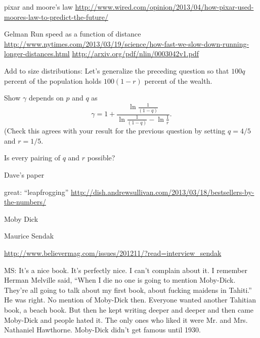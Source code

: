 \begin{frame}
  
pixar and moore's law
\url{http://www.wired.com/opinion/2013/04/how-pixar-used-moores-law-to-predict-the-future/}
\end{frame}


\begin{frame}
  
Gelman
Run speed as a function of distance
\url{http://www.nytimes.com/2013/03/19/science/how-fast-we-slow-down-running-longer-distances.html}
\url{http://arxiv.org/pdf/nlin/0003042v1.pdf}
\end{frame}


\begin{frame}
  

Add to size distributions:
    Let's generalize the preceding question so
    that $100q$ percent of the population
    holds $100(1-r)$ percent of the wealth.

    Show $\gamma$ depends on $p$ and $q$ as 
    $$
    \gamma
    =
    1 +
    \frac{\ln \frac{1}{(1-q)}}
      {\ln\frac{1}{(1-q)} - \ln \frac{1}{r}}.
    $$
    (Check this agrees with your result
    for the previous question by setting
    $q=4/5$ and $r=1/5$.

    Is every pairing of $q$ and $r$ possible?

Dave's paper


\end{frame}




great:
``leapfrogging''
\url{http://dish.andrewsullivan.com/2013/03/18/bestsellers-by-the-numbers/}


Moby Dick

Maurice Sendak

\url{http://www.believermag.com/issues/201211/?read=interview\_sendak}

MS: It's a nice book. It's perfectly nice. I can't complain about
it. I remember Herman Melville said, ``When I die no one is going to
mention Moby-Dick. They're all going to talk about my first book,
about fucking maidens in Tahiti.'' He was right. No mention of
Moby-Dick then. Everyone wanted another Tahitian book, a beach
book. But then he kept writing deeper and deeper and then came
Moby-Dick and people hated it. The only ones who liked it were Mr. and
Mrs. Nathaniel Hawthorne. Moby-Dick didn't get famous until 1930.

